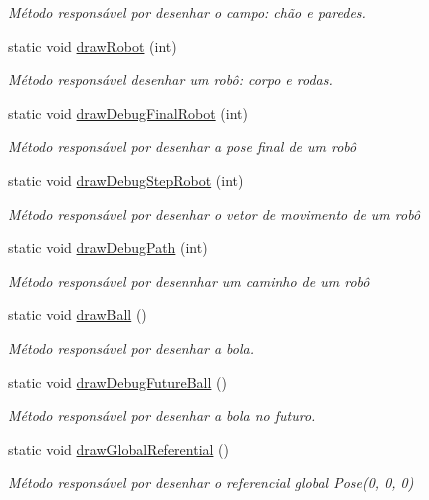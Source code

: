 \begin{DoxyCompactItemize}
\begin{DoxyCompactList}\small\item\em Método responsável por desenhar o campo\+: chão e paredes. \end{DoxyCompactList}\item 
static void \hyperlink{classGraphics_aea303675636309a511de1b2158cb1105}{draw\+Robot} (int)
\begin{DoxyCompactList}\small\item\em Método responsável desenhar um robô\+: corpo e rodas. \end{DoxyCompactList}\item 
static void \hyperlink{classGraphics_a9cb884049d4318fd4f0ee57f293d5281}{draw\+Debug\+Final\+Robot} (int)
\begin{DoxyCompactList}\small\item\em Método responsável por desenhar a pose final de um robô \end{DoxyCompactList}\item 
static void \hyperlink{classGraphics_a9109b4c601fa113e416842d1fb98cc33}{draw\+Debug\+Step\+Robot} (int)
\begin{DoxyCompactList}\small\item\em Método responsável por desenhar o vetor de movimento de um robô \end{DoxyCompactList}\item 
static void \hyperlink{classGraphics_a19c836249f27f13ae686f33819699047}{draw\+Debug\+Path} (int)
\begin{DoxyCompactList}\small\item\em Método responsável por desennhar um caminho de um robô \end{DoxyCompactList}\item 
static void \hyperlink{classGraphics_a8e0114e205ef00c6284ed40f14cea84a}{draw\+Ball} ()\hypertarget{classGraphics_a8e0114e205ef00c6284ed40f14cea84a}{}\label{classGraphics_a8e0114e205ef00c6284ed40f14cea84a}

\begin{DoxyCompactList}\small\item\em Método responsável por desenhar a bola. \end{DoxyCompactList}\item 
static void \hyperlink{classGraphics_a099efcc1425c088c977a405c5065fcd3}{draw\+Debug\+Future\+Ball} ()
\begin{DoxyCompactList}\small\item\em Método responsável por desenhar a bola no futuro. \end{DoxyCompactList}\item 
static void \hyperlink{classGraphics_a5502c120c0c7db72f6c1d2c5d36900aa}{draw\+Global\+Referential} ()
\begin{DoxyCompactList}\small\item\em Método responsável por desenhar o referencial global Pose(0, 0, 0) \end{DoxyCompactList}\end{DoxyCompactItemize}
